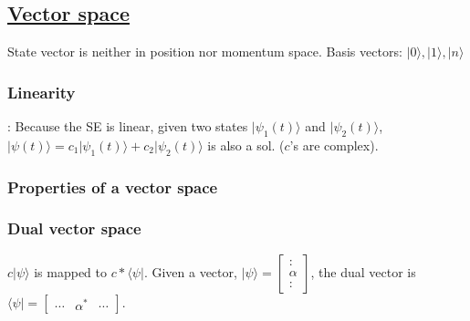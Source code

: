 \subsection{\underline{Vector space}}
State vector is neither in position nor momentum space. Basis vectors: $|0 \rangle, |1 \rangle, |n \rangle$

\subsubsection{Linearity}: Because the SE is linear, given two states $|\psi_1(t) \rangle$ and $|\psi_2(t) \rangle$, $|\psi(t) \rangle = c_1 |\psi_1(t) \rangle + c_2|\psi_2(t)\rangle$ is also a sol. ($c$'s are complex).

\subsubsection{Properties of a vector space}

\subsubsection{Dual vector space}
$c|\psi \rangle$ is mapped to $c* \langle \psi |$. Given a vector, $|\psi \rangle = \begin{bmatrix} : \\ \alpha \\ : \end{bmatrix}$, the dual vector is $\langle \psi | = \begin{bmatrix} \cdots & \alpha^* & \cdots \end{bmatrix}$.

